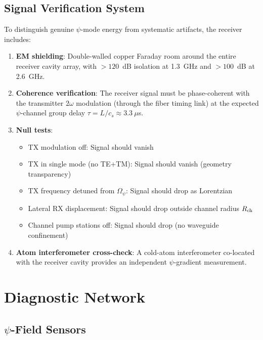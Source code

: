 \documentclass[11pt,letterpaper]{article}
\begin{document}
\subsection{Signal Verification System}

To distinguish genuine $\psi$-mode energy from systematic artifacts,
the receiver includes:

\begin{enumerate}
\item \textbf{EM shielding}: Double-walled copper Faraday room around
the entire receiver cavity array, with $> 120$~dB isolation at 1.3~GHz
and $> 100$~dB at 2.6~GHz.

\item \textbf{Coherence verification}: The receiver signal must be
phase-coherent with the transmitter $2\omega$ modulation (through the
fiber timing link) at the expected $\psi$-channel group delay
$\tau = L/c_s \approx 3.3~\mu$s.

\item \textbf{Null tests}:
\begin{itemize}
\item TX modulation off: Signal should vanish
\item TX in single mode (no TE+TM): Signal should vanish
(geometry transparency)
\item TX frequency detuned from $\Omega_\psi$: Signal should
drop as Lorentzian
\item Lateral RX displacement: Signal should drop outside
channel radius $R_{\rm ch}$
\item Channel pump stations off: Signal should drop
(no waveguide confinement)
\end{itemize}

\item \textbf{Atom interferometer cross-check}: A cold-atom
interferometer co-located with the receiver cavity provides an
independent $\psi$-gradient measurement.
\end{enumerate}

\section{Diagnostic Network}

\subsection{$\psi$-Field Sensors}
\end{document}

